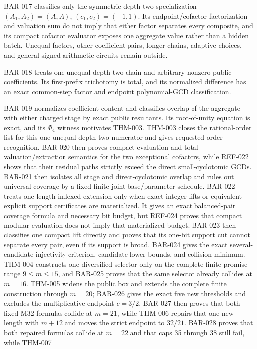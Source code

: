 \documentclass[11pt]{article}
\begin{document}
BAR-017 classifies only the symmetric depth-two specialization
\((A_1,A_2)=(A,A)\), \((c_1,c_2)=(-1,1)\). Its endpoint/cofactor
factorization and valuation sum do not imply that either factor separates
every composite, and its compact cofactor evaluator exposes one aggregate
value rather than a hidden batch. Unequal factors, other coefficient pairs,
longer chains, adaptive choices, and general signed arithmetic circuits
remain outside.

BAR-018 treats one unequal depth-two chain and arbitrary nonzero public
coefficients. Its first-prefix trichotomy is total, and its normalized
difference has an exact common-step factor and endpoint polynomial-GCD
classification.

BAR-019 normalizes coefficient content and classifies overlap of the
aggregate with either charged stage by exact public resultants. Its
root-of-unity equation is exact, and its \(\Phi_4\) witness motivates
THM-003. THM-003 closes the rational-order list for this one unequal
depth-two numerator and gives requested-order recognition. BAR-020 then
proves compact evaluation and total valuation/extraction semantics for the
two exceptional cofactors, while REF-022 shows that their residual paths
strictly exceed the direct small-cyclotomic GCDs. BAR-021 then isolates all
stage and direct-cyclotomic overlap and rules out universal coverage by a
fixed finite joint base/parameter schedule. BAR-022 treats one
length-indexed extension only when exact integer lifts or equivalent explicit
support certificates are materialized. It gives an exact balanced-pair
coverage formula and necessary bit budget, but REF-024 proves that compact
modular evaluation does not imply that materialized budget. BAR-023 then
classifies one compact lift directly and proves that its one-bit support cut
cannot separate every pair, even if its support is broad. BAR-024 gives the
exact several-candidate injectivity criterion, candidate lower bounds, and
collision minimum. THM-004 constructs one diversified selector only on the
complete finite promise range \(9\le m\le15\), and BAR-025 proves that the
same selector already collides at \(m=16\). THM-005 widens the public box and
extends the complete finite construction through \(m=20\); BAR-026 gives the
exact five new thresholds and excludes the multiplicative endpoint
\(c=3/2\). BAR-027 then proves that both fixed M32 formulas collide at
\(m=21\), while THM-006 repairs that one new length with \(m+12\) and moves
the strict endpoint to \(32/21\). BAR-028 proves that both repaired formulas
collide at \(m=22\) and that caps 35 through 38 still fail, while THM-007
\end{document}
